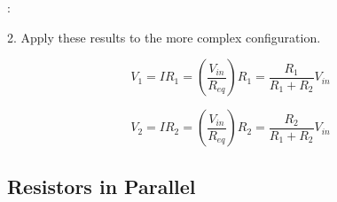 \documentclass[handout]{beamer}
\begin{document}
\begin{frame}{\secname : \subsecname}

2. Apply these results to the more complex configuration.

\begin{equation}
    V_1 = IR_1 = \left( \dfrac{V_{in}}{R_{eq}} \right) R_1 =  \dfrac{R_1}{R_1+R_2} V_{in}
\end{equation}

\begin{equation}
    V_2 = IR_2 = \left( \dfrac{V_{in}}{R_{eq}} \right) R_2 =  \dfrac{R_2}{R_1+R_2} V_{in}
\end{equation}

\begin{figure}[b!]
\end{figure}
\end{frame}

\subsection{Resistors in Parallel}
\end{document}
